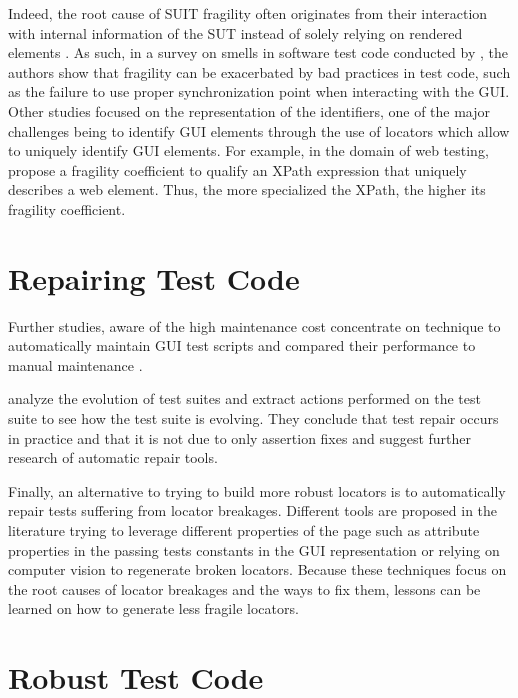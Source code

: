 Indeed, the root cause of SUIT fragility often originates from their interaction with internal information of the SUT instead of solely relying on rendered elements \textcite{Yandrapally2014}. As such, in a survey on smells in software test code conducted by \textcite{Garousi2018}, the authors show that fragility can be exacerbated by bad practices in test code, such as the failure to use proper synchronization point when interacting with the GUI. Other studies focused on the representation of the identifiers, one of the major challenges being to identify GUI elements through the use of locators \cite{Hammoudi2016} which allow to uniquely identify GUI elements. For example, in the domain of web testing, \textcite{Leotta2015} propose a fragility coefficient to qualify an XPath expression that uniquely describes a web element. Thus, the more specialized the XPath, the higher its fragility coefficient.

\section{Repairing Test Code}
\label{sec:related-repair}

Further studies, aware of the high maintenance cost concentrate on technique to automatically maintain GUI test scripts and compared their performance to manual maintenance \cite{Grechanik2009, Grechanik2009b}.

\textcite{Pinto2012} analyze the evolution of test suites and extract actions performed on the test suite to see how the test suite is evolving. They conclude that test repair occurs in practice and that it is not due to only assertion fixes and suggest further research of automatic repair tools.

Finally, an alternative to trying to build more robust locators is to automatically repair tests suffering from locator breakages. Different tools are proposed in the literature trying to leverage different properties of the page such as attribute properties in the passing tests\cite{Choudhary2011} constants in the GUI representation\cite{Kirinuki2019} or relying on computer vision\cite{Stocco2018} to regenerate broken locators. Because these techniques focus on the root causes of locator breakages and the ways to fix them, lessons can be learned on how to generate less fragile locators.

\section{Robust Test Code}
\label{sec:related-robust}

